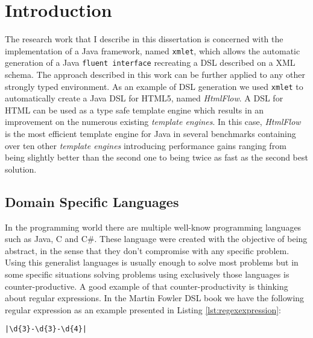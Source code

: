 \chapter{Introduction}
\label{cha:introduction}

The research work that I describe in this dissertation is concerned with the implementation of a Java framework, named \texttt{xmlet}, which allows the automatic generation of a Java \texttt{fluent interface}\cite{fluentinterface} recreating a \ac{DSL}\cite{dsl} described on a \ac{XML} schema. The approach described in this work can be further applied to any other strongly typed environment. As an example of \ac{DSL} generation we used \texttt{xmlet} to automatically create a Java \ac{DSL} for \ac{HTML}5, named \textit{HtmlFlow}. A \ac{DSL} for \ac{HTML} can be used as a type safe template engine which results in an improvement on the numerous existing \textit{template engines}. In this case, \textit{HtmlFlow} is the most efficient template engine for Java in several benchmarks containing over ten other \textit{template engines} introducing performance gains ranging from being slightly better than the second one to being twice as fast as the second best solution.

\section{Domain Specific Languages}


In the programming world there are multiple well-know programming languages such as Java, C and C\#. These language were created with the objective of being abstract, in the sense that they don't compromise with any specific problem. Using this generalist languages is usually enough to solve most problems but in some specific situations solving problems using exclusively those languages is counter-productive. A good example of that counter-productivity is thinking about regular expressions. In the Martin Fowler \ac{DSL} book\cite{dslbook} we have the following regular expression as an example presented in Listing \ref{lst:regexexpression}:

\bigskip

\begin{minipage}{\linewidth}
\begin{lstlisting}[caption={Regular Expression Example}, label={lst:regexexpression}, style=dynamicviewsex]
|\d{3}-\d{3}-\d{4}|
\end{lstlisting}
\end{minipage} 

